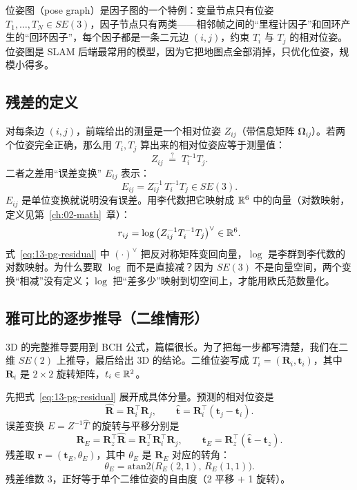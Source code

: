 \begin{definition}[位姿图]
位姿图（pose graph）是因子图的一个特例：变量节点只有位姿 $T_1,\dots,T_N\in SE(3)$，因子节点只有两类——相邻帧之间的``里程计因子''和回环产生的``回环因子''，每个因子都是一条二元边 $(i,j)$，约束 $T_i$ 与 $T_j$ 的相对位姿。位姿图是 SLAM 后端最常用的模型，因为它把地图点全部消掉，只优化位姿，规模小得多。
\end{definition}

\subsection{残差的定义}

对每条边 $(i,j)$，前端给出的测量是一个相对位姿 $Z_{ij}$（带信息矩阵 $\bm{\Omega}_{ij}$）。若两个位姿完全正确，那么用 $T_i,T_j$ 算出来的相对位姿应等于测量值：
\begin{equation}
Z_{ij}\;\overset{?}{=}\;T_i^{-1}T_j .
\end{equation}
二者之差用``误差变换'' $E_{ij}$ 表示：
\begin{equation}
E_{ij}=Z_{ij}^{-1}\,T_i^{-1}T_j\in SE(3).
\label{eq:13-error-transform}
\end{equation}
$E_{ij}$ 是单位变换就说明没有误差。用李代数把它映射成 $\mathbb{R}^{6}$ 中的向量（对数映射，定义见第~\ref{ch:02-math}~章）：
\begin{equation}
r_{ij}=\log\big(Z_{ij}^{-1}T_i^{-1}T_j\big)^{\vee}\in\mathbb{R}^{6}.
\label{eq:13-pg-residual}
\end{equation}
式~\eqref{eq:13-pg-residual} 中 $(\cdot)^{\vee}$ 把反对称矩阵变回向量，$\log$ 是李群到李代数的对数映射。为什么要取 $\log$ 而不是直接减？因为 $SE(3)$ 不是向量空间，两个变换``相减''没有定义；$\log$ 把``差多少''映射到切空间上，才能用欧氏范数量化。

\subsection{雅可比的逐步推导（二维情形）}

3D 的完整推导要用到 BCH 公式，篇幅很长。为了把每一步都写清楚，我们在二维 $SE(2)$ 上推导，最后给出 3D 的结论。二维位姿写成 $T_i=(\bm{R}_i,\bm{t}_i)$，其中 $\bm{R}_i$ 是 $2\times2$ 旋转矩阵，$t_i\in\mathbb{R}^{2}$。

先把式~\eqref{eq:13-pg-residual} 展开成具体分量。预测的相对位姿是
\begin{equation}
\hat{\bm{R}}=\bm{R}_i^{\top}\bm{R}_j,\qquad
\hat{\bm{t}}=\bm{R}_i^{\top}(\bm{t}_j-\bm{t}_i).
\end{equation}
误差变换 $E=Z^{-1}\hat{T}$ 的旋转与平移分别是
\begin{equation}
\bm{R}_E=\bm{R}_z^{\top}\hat{\bm{R}}=\bm{R}_z^{\top}\bm{R}_i^{\top}\bm{R}_j,
\qquad
\bm{t}_E=\bm{R}_z^{\top}(\hat{\bm{t}}-\bm{t}_z).
\label{eq:13-E-2d}
\end{equation}
残差取 $\bm{r}=(\bm{t}_E,\theta_E)$，其中 $\theta_E$ 是 $\bm{R}_E$ 对应的转角：
\begin{equation}
\theta_E=\mathrm{atan2}\big(R_E(2,1),\,R_E(1,1)\big).
\end{equation}
残差维数 3，正好等于单个二维位姿的自由度（2 平移 $+$ 1 旋转）。

